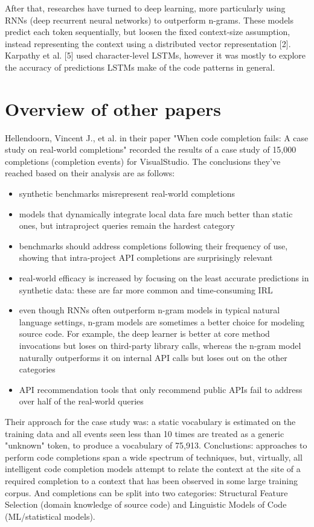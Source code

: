 After that, researches have turned to deep learning, more particularly using RNNs (deep recurrent
neural networks) to outperform n-grams. These models predict each token sequentially, but loosen
the fixed context-size assumption, instead representing the context using a distributed vector
representation [2]. Karpathy et al. [5] used character-level LSTMs, however it was mostly to explore
the accuracy of predictions LSTMs make of the code patterns in general.

\section{Overview of other papers}
Hellendoorn, Vincent J., et al. in their paper "When code completion fails: A case study on real-world
completions" recorded the results of a case study of 15,000 completions (completion events) for VisualStudio.
The conclusions they've reached based on their analysis are as follows:
\begin{itemize}
	\item synthetic benchmarks misrepresent real-world completions
    \item models that dynamically integrate local data fare much better than static ones, but intraproject queries remain the hardest category
    \item benchmarks should address completions following their frequency of use, showing that intra-project API completions are surprisingly relevant
    \item real-world efficacy is increased by focusing on the least accurate predictions in synthetic data: these are far more common and time-consuming IRL
    \item even though RNNs often outperform n-gram models in typical natural language settings, n-gram models are sometimes a better choice for modeling source code. For example, the deep learner is better at core method invocations but loses on third-party library calls, whereas the n-gram model naturally outperforms it on internal API calls but loses out on the other categories
    \item API recommendation tools that only recommend public APIs fail to address over half of the real-world queries
\end{itemize}
Their approach for the case study was: a static vocabulary is estimated on the training data and
all events seen less than 10 times are treated as a generic "unknown" token, to produce a vocabulary
of 75,913. Conclustions: approaches to perform code completions span a wide spectrum of techniques,
but, virtually, all intelligent code completion models attempt to relate the context at the site of a
required completion to a context that has been observed in some large training corpus. And completions
can be split into two categories: Structural Feature Selection (domain knowledge of source code)
and Linguistic Models of Code (ML/statistical models).


